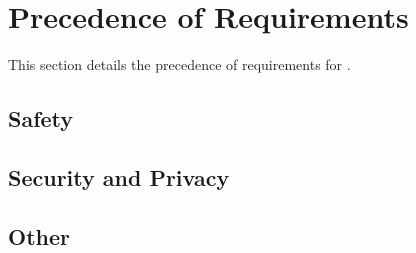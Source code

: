 \KNEADSECTIONNEWPAGE
\section{Precedence of Requirements}
\label{lab:sec_Precedence}
% 
This section details the precedence of requirements for \ThisSys.
\KNEADSUBSECTIONNEWPAGE
\subsection{Safety}
\label{lab:ssec_Precedence_Safety}




\KNEADSUBSECTIONNEWPAGE
\subsection{Security and Privacy}
\label{lab:ssec_Precedence_SecurityAndPrivacy}



\KNEADSUBSECTIONNEWPAGE
\subsection{Other}
\label{lab:ssec_Precedence_Other}



